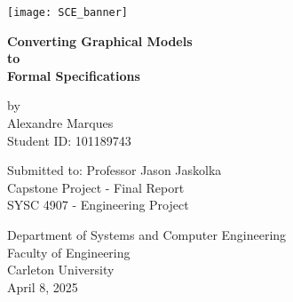 \begin{titlepage}
    \begin{center}
        \texttt{[image: SCE\_banner]}
        \vfill
        \vspace*{1cm}

        \Large
        \textbf{Converting Graphical Models}\\
        \textbf{to}\\
        \textbf{Formal Specifications}\\


        \vspace{0.5cm}


        \vspace{1.5cm}

        \small
        by\\
        \vspace{0.5cm}
        Alexandre Marques\\
        Student ID: 101189743

        \vfill
        Submitted to: Professor Jason Jaskolka \\
        \vspace{0.8cm}
        Capstone Project - Final Report \\
        SYSC 4907 - Engineering Project

        \vspace{1.5cm}


        Department of Systems and Computer Engineering\\
        Faculty of Engineering\\
        Carleton University\\
        \vspace{1.5cm}
        April 8, 2025

    \end{center}
\end{titlepage}